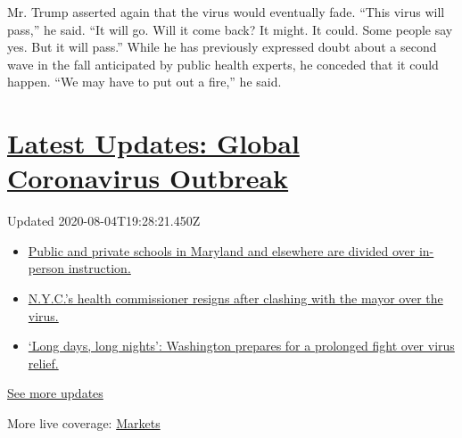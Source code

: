 Mr. Trump asserted again that the virus would eventually fade. ``This
virus will pass,'' he said. ``It will go. Will it come back? It might.
It could. Some people say yes. But it will pass.'' While he has
previously expressed doubt about a second wave in the fall anticipated
by public health experts, he conceded that it could happen. ``We may
have to put out a fire,'' he said.

\hypertarget{latest-updates-global-coronavirus-outbreak}{%
\section{\texorpdfstring{\href{https://www.nytimes3xbfgragh.onion/2020/08/04/world/coronavirus-cases.html?action=click\&pgtype=Article\&state=default\&region=MAIN_CONTENT_1\&context=storylines_live_updates}{Latest
Updates: Global Coronavirus
Outbreak}}{Latest Updates: Global Coronavirus Outbreak}}\label{latest-updates-global-coronavirus-outbreak}}

Updated 2020-08-04T19:28:21.450Z

\begin{itemize}
\tightlist
\item
  \href{https://www.nytimes3xbfgragh.onion/2020/08/04/world/coronavirus-cases.html?action=click\&pgtype=Article\&state=default\&region=MAIN_CONTENT_1\&context=storylines_live_updates\#link-4825b93}{Public
  and private schools in Maryland and elsewhere are divided over
  in-person instruction.}
\item
  \href{https://www.nytimes3xbfgragh.onion/2020/08/04/world/coronavirus-cases.html?action=click\&pgtype=Article\&state=default\&region=MAIN_CONTENT_1\&context=storylines_live_updates\#link-4d1eafa8}{N.Y.C.'s
  health commissioner resigns after clashing with the mayor over the
  virus.}
\item
  \href{https://www.nytimes3xbfgragh.onion/2020/08/04/world/coronavirus-cases.html?action=click\&pgtype=Article\&state=default\&region=MAIN_CONTENT_1\&context=storylines_live_updates\#link-6b644638}{`Long
  days, long nights': Washington prepares for a prolonged fight over
  virus relief.}
\end{itemize}

\href{https://www.nytimes3xbfgragh.onion/2020/08/04/world/coronavirus-cases.html?action=click\&pgtype=Article\&state=default\&region=MAIN_CONTENT_1\&context=storylines_live_updates}{See
more updates}

More live coverage:
\href{https://www.nytimes3xbfgragh.onion/live/2020/08/04/business/stock-market-today-coronavirus?action=click\&pgtype=Article\&state=default\&region=MAIN_CONTENT_1\&context=storylines_live_updates}{Markets}

